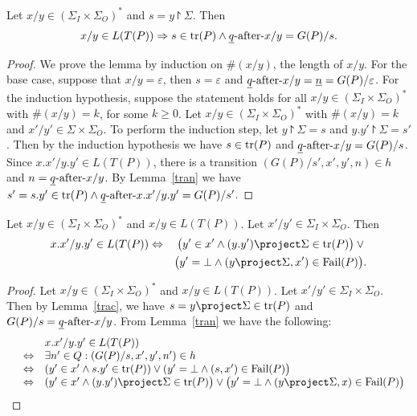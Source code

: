 \begin{lemma}\label{trac}

Let $x/y\in (\Sigma_I\times\Sigma_O)^*$ and $s=y\project \Sigma$. Then $$x/y\in L(T(P))\Rightarrow s\in\text{tr}(P) \wedge \underline q\text{-after-} x/y=G(P)/s.$$
\end{lemma}
\begin{proof}
We prove the lemma by induction on $\#(x/y)$,  the length of $x/y$. For the base case, suppose that $x/y=\varepsilon $, then $s=\varepsilon $ and $\underline q\text{-after-} x/y=\underline n=G(P)/{\varepsilon }$. For the induction hypothesis, suppose the statement holds for all $x/y\in (\Sigma_I\times\Sigma_O)^*$ with $\#(x/y)=k$, for some $k\ge 0$. Let $x/y\in (\Sigma_I\times\Sigma_O)^*$ with $\#(x/y)=k$ and $x'/y'\in \Sigma\times \Sigma_O$. To perform the induction step, let $y\project \Sigma=s$ and $y.y'\project \Sigma=s'$. Then by the induction hypothesis we have $s\in\text{tr}(P)$ and $\underline q\text{-after-} x/y=G(P)/s$.
Since $x.x'/y.y'\in L(T(P))$, there is a transition $(G(P)/s',x',y',n)\in h$ and $n=\underline q\text{-after-} x/y$. By Lemma~\ref{tran} we have $s'=s.y'\in \text{tr}(P)\wedge \underline q\text{-after-} x.x'/y.y'=G(P)/s'$.
\end{proof}%


\begin{lemma}\label{exte}
Let $x/y\in (\Sigma_I\times \Sigma_O)^*$ and $x/y\in L(T(P))$. Let $x'/y'\in \Sigma_I\times \Sigma_O$. Then
\begin{eqnarray*}
x.x'/y.y'\in L(T(P)) & \Leftrightarrow  &
\big(y'\in x'\wedge (y.y')\project \Sigma\in \trc(P)\big)\vee {}
\\ & & \big(y'=\bot\wedge (y\project \Sigma, x')\in {\text {\rm Fail}}(P)\big).
\end{eqnarray*}
\end{lemma}

\begin{proof}
Let $x/y\in (\Sigma_I\times \Sigma_O)^*$ and $x/y\in L(T(P))$. Let $x'/y'\in \Sigma_I\times \Sigma_O$. Then by Lemma~\ref{trac}, we have $s=y\project \Sigma\in \trc(P)$ and $G(P)/s=\underline q\text{-after-} x/y$. From Lemma~\ref{tran} we have the following:
\[\begin{array}{lll}
&&x.x'/y.y'\in L(T(P)) \\&\Leftrightarrow & \exists n'\in Q: (G(P)/s,x',y',n')\in h\\
&\Leftrightarrow & (y'\in x'\wedge s.y'\in \trc(P))\vee (y'=\bot\wedge (s, x')\in {\text {\rm Fail}}(P)\big)\\
&\Leftrightarrow & (y'\in x'\wedge (y.y')\project \Sigma\in \trc(P)\big)\vee \big(y'=\bot\wedge (y\project \Sigma, x)\in {\text {\rm Fail}}(P)\big)\end{array}
\]
\end{proof}


